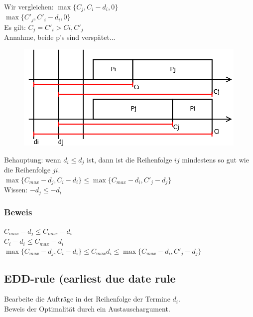 Wir vergleichen: $\max\{C_j, C_i-d_i,0\}$\\
 $\max\{C'_j, C'_i-d_i,0\}$\\
 Es gilt: $C_j = C'_i > Ci,C'_j$\\
 Annahme, beide p's sind verspätet...
 \begin{figure}[h]
    \begin{center}
        \includegraphics[width=\textwidth / 2]{../GFX/vl13_8.png}
        \label{fig:vl13_1}
    \end{center}
\end{figure}
 Behauptung: wenn $d_i \leq d_j$ ist, dann ist die Reihenfolge $ij$ mindestens so gut wie die Reihenfolge $ji$.\\
 $\max \{C_{max}-d_j,C_{i}-d_i\} \leq \max	\{C_{max}-d_i,C'_j-d_j\}$\\
 Wissen: $-d_j \leq -d_i$
 \subsubsection{Beweis}
 $C_{max}-d_j \leq C_{max}-d_i$\\
 $C_i - d_i \leq C_{max}-d_i$\\
 $\max \{C_{max}-d_j,C_i-d_i\} \leq C_{max} d_i \leq \max \{C_{max}-d_i,C'_j-d_j\}$\\
 \subsection{EDD-rule (earliest due date rule}
 Bearbeite die Aufträge in der Reihenfolge der Termine $d_i$.\\
 Beweis der Optimalität durch ein Austauschargument.\\
 
